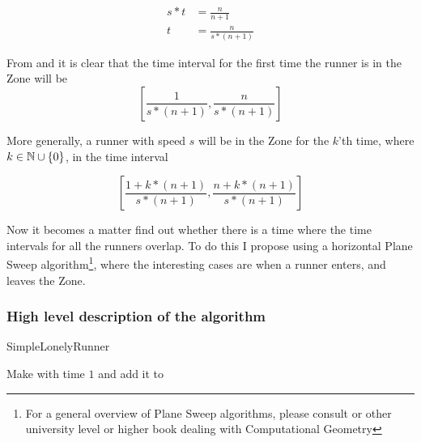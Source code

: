 \begin{equation}
\label{eqa:speedTwo}
\begin{split}
s * t &= \frac{n}{n+1} \\
t &= \frac{n}{s * (n+1)}
\end{split}
\end{equation}

From  and  it is clear that the time interval for the first time the runner is in the Zone will be 
\begin{displaymath}
\left[\frac{1}{s * (n+1)}, \frac{n}{s * (n+1)}\right]
\end{displaymath}

More generally, a runner with speed $s$ will be in the Zone for the $k$'th time, where $k \in \mathbb{N} \cup \{0\}$, in the time interval 

\begin{equation}
\label{eqa:genericZone}
\left[\frac{1 + k * (n+1)}{s * (n+1)}, \frac{n + k * (n+1)}{s * (n+1)}\right] 
\end{equation}

Now it becomes a matter find out whether there is a time where the time intervals for all the runners overlap. To do this I propose using a horizontal Plane Sweep algorithm\footnote{For a general overview of Plane Sweep algorithms, please consult \cite{citeulike:3347056} or other university level or higher book dealing with Computational Geometry}, where the interesting cases are when a runner enters, and leaves the Zone. 

\subsubsection{High level description of the algorithm}

\begin{algorithm}[H]
  \caption{SimpleLonelyRunner}
  \highlights
  
  Make \finish with time $1$ and add it to \li

  
\end{algorithm}

